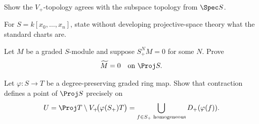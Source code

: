 \begin{exercise}\label{exr:vi35-23}
Show the \(V_+\)-topology agrees with the subspace topology from \(\Spec S\).
\end{exercise}

\begin{exercise}[Boundary to VI/36]\label{exr:vi35-24}
For \(S=k[x_0,\ldots,x_n]\), state without developing projective-space theory what the standard charts are.
\end{exercise}

\begin{exercise}\label{exr:vi35-25}
Let \(M\) be a graded \(S\)-module and suppose \(S_+^N M=0\) for some \(N\). Prove
\[
\widetilde M=0
\quad\text{on }\Proj S.
\]
\end{exercise}

\begin{exercise}\label{exr:vi35-26}
Let \(\varphi:S\to T\) be a degree-preserving graded ring map. Show that contraction defines a point of
\(\Proj S\) precisely on
\[
U=\Proj T\setminus V_+\!\bigl(\varphi(S_+)T\bigr)
   =\bigcup_{f\in S_+\text{ homogeneous}}D_+(\varphi(f)).
\]
\end{exercise}
